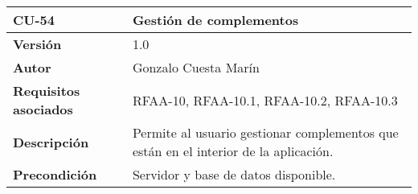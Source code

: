 \begin{longtable}[]{@{}ll@{}}
\toprule
\begin{minipage}[b]{0.21\columnwidth}\raggedright
\textbf{CU-54}\strut
\end{minipage} & \begin{minipage}[b]{0.73\columnwidth}\raggedright
\textbf{Gestión de complementos}\strut
\end{minipage}\tabularnewline
\midrule
\endhead
\begin{minipage}[t]{0.21\columnwidth}\raggedright
\textbf{Versión}\strut
\end{minipage} & \begin{minipage}[t]{0.73\columnwidth}\raggedright
1.0\strut
\end{minipage}\tabularnewline
\begin{minipage}[t]{0.21\columnwidth}\raggedright
\textbf{Autor}\strut
\end{minipage} & \begin{minipage}[t]{0.73\columnwidth}\raggedright
Gonzalo Cuesta Marín\strut
\end{minipage}\tabularnewline
\begin{minipage}[t]{0.21\columnwidth}\raggedright
\textbf{Requisitos asociados}\strut
\end{minipage} & \begin{minipage}[t]{0.73\columnwidth}\raggedright
RFAA-10, RFAA-10.1, RFAA-10.2, RFAA-10.3\strut
\end{minipage}\tabularnewline
\begin{minipage}[t]{0.21\columnwidth}\raggedright
\textbf{Descripción}\strut
\end{minipage} & \begin{minipage}[t]{0.73\columnwidth}\raggedright
Permite al usuario gestionar complementos que están en el interior de la
aplicación.\strut
\end{minipage}\tabularnewline
\begin{minipage}[t]{0.21\columnwidth}\raggedright
\textbf{Precondición}\strut
\end{minipage} & \begin{minipage}[t]{0.73\columnwidth}\raggedright
Servidor y base de datos disponible.


\end{minipage}
\end{longtable}
